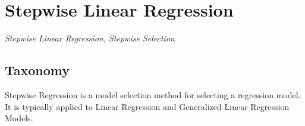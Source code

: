 
\section{Stepwise Linear Regression} 
\label{sec:stepwise}

\emph{Stepwise Linear Regression, Stepwise Selection}

\subsection{Taxonomy}
Stepwise Regression is a model selection method for selecting a regression model. It is typically applied to Linear Regression and Generalized Linear Regression Models.

